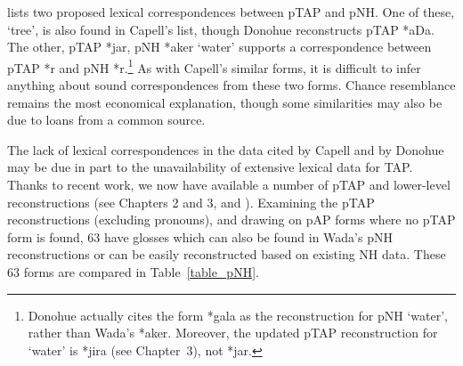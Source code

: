 \addtocounter{footnote}{-2}


\citet{Donohue2008boundpron} lists two proposed lexical correspondences between pTAP and pNH. One of these, `tree', is also found in Capell's list, though Donohue reconstructs pTAP *aDa. The other, pTAP *jar, pNH *aker `water' supports a correspondence between pTAP *r and pNH *r.\footnote{Donohue actually cites the form *gala as the reconstruction for pNH `water', rather than Wada's *aker. Moreover, the updated pTAP reconstruction for `water' is *jira (see Chapter~3), not *jar.} As with Capell's similar forms, it is difficult to infer anything about sound correspondences from these two forms. Chance resemblance remains the most economical explanation, though some similarities may also be due to loans from a common source.


The lack of lexical correspondences in the data cited by Capell and by Donohue may be due in part to the unavailability of extensive lexical data for TAP. Thanks to recent work, we now have available a number of pTAP and lower-level reconstructions (see Chapters 2 and 3, and \citealt{SchapperEtAl2012historical}). Examining the pTAP reconstructions (excluding pronouns), and drawing on pAP forms where no pTAP form is found, 63 have glosses which can also be found in Wada's \citeyearpar{Wada1980} pNH reconstructions or can be easily reconstructed based on existing NH data. These 63 forms are compared in Table~\ref{table_pNH}. 
 





